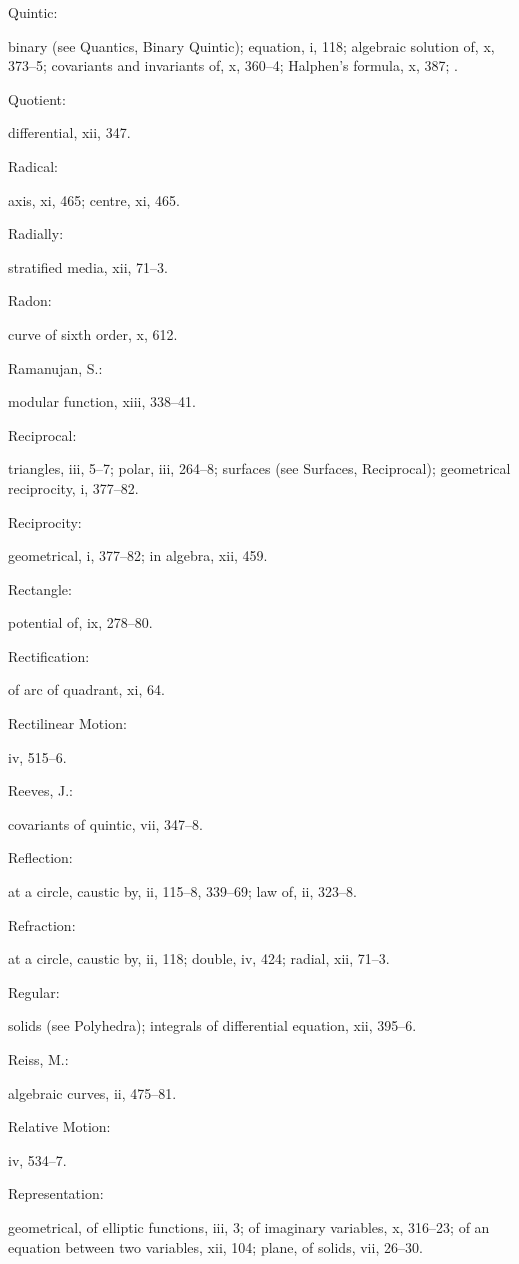 \documentclass[11pt,a4paper]{book}
\providecommand{\V}[1]{#1}
\providecommand{\IndexEntry}[2]{#1\dotfill #2\par}
\begin{document}
\IndexEntry{Quintic}: binary (see Quantics, Binary Quintic); equation, \V{i}, 118; algebraic solution of, \V{x}, 373--5; covariants and invariants of, \V{x}, 360--4; Halphen's formula, \V{x}, 387; .

\IndexEntry{Quotient}: differential, \V{xii}, 347.

\IndexEntry{Radical}: axis, \V{xi}, 465; centre, \V{xi}, 465.

\IndexEntry{Radially}: stratified media, \V{xii}, 71--3.

\IndexEntry{Radon}: curve of sixth order, \V{x}, 612.

\IndexEntry{Ramanujan, S.}: modular function, \V{xiii}, 338--41.

\IndexEntry{Reciprocal}: triangles, \V{iii}, 5--7; polar, \V{iii}, 264--8; surfaces (see Surfaces, Reciprocal); geometrical reciprocity, \V{i}, 377--82.

\IndexEntry{Reciprocity}: geometrical, \V{i}, 377--82; in algebra, \V{xii}, 459.

\IndexEntry{Rectangle}: potential of, \V{ix}, 278--80.

\IndexEntry{Rectification}: of arc of quadrant, \V{xi}, 64.

\IndexEntry{Rectilinear Motion}: \V{iv}, 515--6.

\IndexEntry{Reeves, J.}: covariants of quintic, \V{vii}, 347--8.

\IndexEntry{Reflection}: at a circle, caustic by, \V{ii}, 115--8, 339--69; law of, \V{ii}, 323--8.

\IndexEntry{Refraction}: at a circle, caustic by, \V{ii}, 118; double, \V{iv}, 424; radial, \V{xii}, 71--3.

\IndexEntry{Regular}: solids (see Polyhedra); integrals of differential equation, \V{xii}, 395--6.

\IndexEntry{Reiss, M.}: algebraic curves, \V{ii}, 475--81.

\IndexEntry{Relative Motion}: \V{iv}, 534--7.

\IndexEntry{Representation}: geometrical, of elliptic functions, \V{iii}, 3; of imaginary variables, \V{x}, 316--23; of an equation between two variables, \V{xii}, 104; plane, of solids, \V{vii}, 26--30.

\newpage

\setcounter{page}{121}
\end{document}
